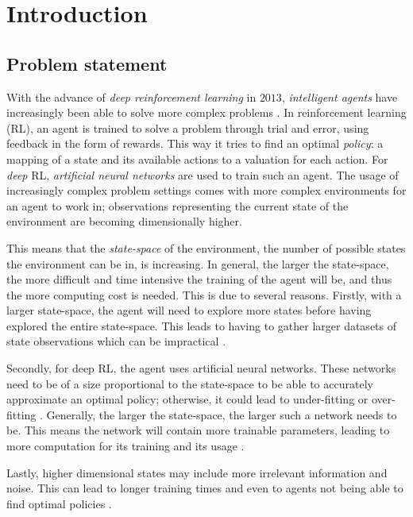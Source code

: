 \chapter{Introduction}\label{introduction}
\section{Problem statement}
With the advance of \emph{deep reinforcement learning} in $2013$, \emph{intelligent agents} have increasingly been able to solve more complex problems \cite{deeprl}. In reinforcement learning (RL), an agent is trained to solve a problem through trial and error, using feedback in the form of rewards. This way it tries to find an optimal \emph{policy}: a mapping of a state and its available actions to a valuation for each action. For \emph{deep} RL, \emph{artificial neural networks} are used to train such an agent. The usage of increasingly complex problem settings comes with more complex environments for an agent to work in; observations representing the current state of the environment are becoming dimensionally higher.
	
This means that the \emph{state-space} of the environment, the number of possible states the environment can be in, is increasing. In general, the larger the state-space, the more difficult and time intensive the training of the agent will be, and thus the more computing cost is needed. This is due to several reasons. Firstly, with a larger state-space, the agent will need to explore more states before having explored the entire state-space. This leads to having to gather larger datasets of state observations which can be impractical \cite{AE_2019}.

Secondly, for deep RL, the agent uses artificial neural networks. These networks need to be of a size proportional to the state-space to be able to accurately approximate an optimal policy; otherwise, it could lead to under-fitting or over-fitting \cite{rlfitting}. Generally, the larger the state-space, the larger such a network needs to be. This means the network will contain more trainable parameters, leading to more computation for its training and its usage \cite{AE_2019}.

Lastly, higher dimensional states may include more irrelevant information and noise. This can lead to longer training times and even to agents not being able to find optimal policies \cite{AE_2016}.

